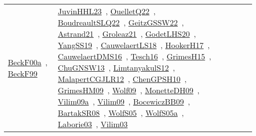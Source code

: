 {\begin{longtable}{lp{3cm}>{\raggedright\arraybackslash}p{6cm}>{\raggedright\arraybackslash}p{6cm}>{\raggedright\arraybackslash}p{8cm}}
\href{../works/BeckF00a.pdf}{BeckF00a}~\cite{BeckF00a}, \href{../works/BeckF99.pdf}{BeckF99}~\cite{BeckF99} & \href{../works/JuvinHHL23.pdf}{JuvinHHL23}~\cite{JuvinHHL23}, \href{../works/OuelletQ22.pdf}{OuelletQ22}~\cite{OuelletQ22}, \href{../works/BoudreaultSLQ22.pdf}{BoudreaultSLQ22}~\cite{BoudreaultSLQ22}, \href{../works/GeitzGSSW22.pdf}{GeitzGSSW22}~\cite{GeitzGSSW22}, \href{../works/Astrand21.pdf}{Astrand21}~\cite{Astrand21}, \href{../works/Groleaz21.pdf}{Groleaz21}~\cite{Groleaz21}, \href{../works/GodetLHS20.pdf}{GodetLHS20}~\cite{GodetLHS20}, \href{../works/YangSS19.pdf}{YangSS19}~\cite{YangSS19}, \href{../works/CauwelaertLS18.pdf}{CauwelaertLS18}~\cite{CauwelaertLS18}, \href{../works/HookerH17.pdf}{HookerH17}~\cite{HookerH17}, \href{../works/CauwelaertDMS16.pdf}{CauwelaertDMS16}~\cite{CauwelaertDMS16}, \href{../works/Tesch16.pdf}{Tesch16}~\cite{Tesch16}, \href{../works/GrimesH15.pdf}{GrimesH15}~\cite{GrimesH15}, \href{../works/ChuGNSW13.pdf}{ChuGNSW13}~\cite{ChuGNSW13}, \href{../works/LimtanyakulS12.pdf}{LimtanyakulS12}~\cite{LimtanyakulS12}, \href{../works/MalapertCGJLR12.pdf}{MalapertCGJLR12}~\cite{MalapertCGJLR12}, \href{../works/ChenGPSH10.pdf}{ChenGPSH10}~\cite{ChenGPSH10}, \href{../works/GrimesHM09.pdf}{GrimesHM09}~\cite{GrimesHM09}, \href{../works/Wolf09.pdf}{Wolf09}~\cite{Wolf09}, \href{../works/MonetteDH09.pdf}{MonetteDH09}~\cite{MonetteDH09}, \href{../works/Vilim09a.pdf}{Vilim09a}~\cite{Vilim09a}, \href{../works/Vilim09.pdf}{Vilim09}~\cite{Vilim09}, \href{../works/BocewiczBB09.pdf}{BocewiczBB09}~\cite{BocewiczBB09}, \href{../works/BartakSR08.pdf}{BartakSR08}~\cite{BartakSR08}, \href{../works/WolfS05.pdf}{WolfS05}~\cite{WolfS05}, \href{../works/WolfS05a.pdf}{WolfS05a}~\cite{WolfS05a}, \href{../works/Laborie03.pdf}{Laborie03}~\cite{Laborie03}, \href{../works/Vilim03.pdf}{Vilim03}~\cite{Vilim03}\\

\end{longtable}}
